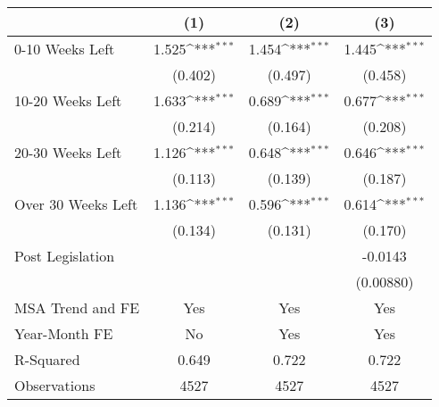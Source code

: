 {
\def\sym#1{\ifmmode^{#1}\else\(^{#1}\)\fi}
\begin{tabular}{l*{3}{c}}
\hline\hline
                    &\multicolumn{1}{c}{(1)}         &\multicolumn{1}{c}{(2)}         &\multicolumn{1}{c}{(3)}         \\
\hline
0-10 Weeks Left     &       1.525\sym{***}&       1.454\sym{***}&       1.445\sym{***}\\
                    &     (0.402)         &     (0.497)         &     (0.458)         \\
\hline
10-20 Weeks Left    &       1.633\sym{***}&       0.689\sym{***}&       0.677\sym{***}\\
                    &     (0.214)         &     (0.164)         &     (0.208)         \\
\hline
20-30 Weeks Left    &       1.126\sym{***}&       0.648\sym{***}&       0.646\sym{***}\\
                    &     (0.113)         &     (0.139)         &     (0.187)         \\
\hline
Over 30 Weeks Left  &       1.136\sym{***}&       0.596\sym{***}&       0.614\sym{***}\\
                    &     (0.134)         &     (0.131)         &     (0.170)         \\
\hline
Post Legislation      &                     &                     &     -0.0143         \\
                    &                     &                     &   (0.00880)         \\
\hline
MSA Trend and FE    &         Yes         &         Yes         &         Yes         \\
Year-Month FE       &          No         &         Yes         &         Yes         \\
R-Squared           &       0.649         &       0.722         &       0.722         \\
Observations        &        4527         &        4527         &        4527         \\
\hline\hline
\end{tabular}
}
